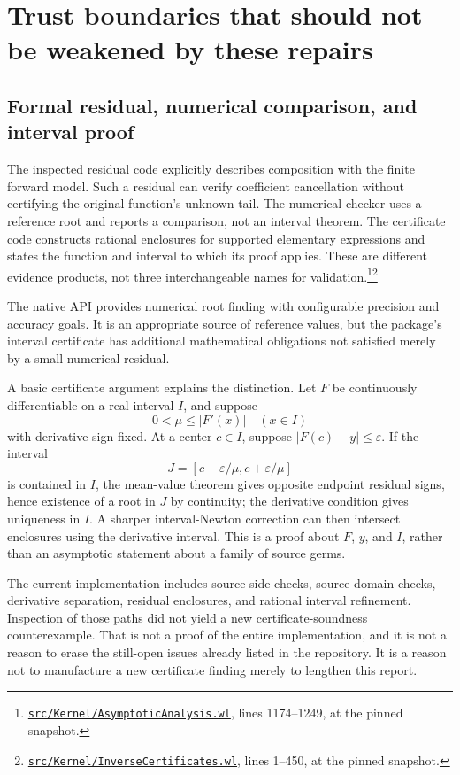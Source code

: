 \documentclass[11pt,letterpaper]{article}
\newcommand{\code}[1]{\texttt{\detokenize{#1}}}
\newcommand{\sr}[3]{\footnote{\href{https://github.com/VladimirReshetnikov/Asymptotic/blob/6687962f3c858a4f93623cfc496f33e35c6763d4/#1\#L#2-L#3}{\nolinkurl{#1}}, lines #2--#3, at the pinned snapshot.}}
\begin{document}
\section{Trust boundaries that should not be weakened by these repairs}

\subsection{Formal residual, numerical comparison, and interval proof}

The inspected residual code explicitly describes composition with the finite forward model. Such a residual can verify coefficient cancellation without certifying the original function's unknown tail. The numerical checker uses a reference root and reports a comparison, not an interval theorem. The certificate code constructs rational enclosures for supported elementary expressions and states the function and interval to which its proof applies. These are different evidence products, not three interchangeable names for validation.\sr{src/Kernel/AsymptoticAnalysis.wl}{1174}{1249}\sr{src/Kernel/InverseCertificates.wl}{1}{450}

The native \code{FindRoot} API provides numerical root finding with configurable precision and accuracy goals. It is an appropriate source of reference values, but the package's interval certificate has additional mathematical obligations not satisfied merely by a small numerical residual.\cite{findroot}

A basic certificate argument explains the distinction. Let $F$ be continuously differentiable on a real interval $I$, and suppose
\[
 0<\mu\leq |F'(x)|\quad(x\in I)
\]
with derivative sign fixed. At a center $c\in I$, suppose $|F(c)-y|\leq\varepsilon$. If the interval
\[
 J=[c-\varepsilon/\mu,c+\varepsilon/\mu]
\]
is contained in $I$, the mean-value theorem gives opposite endpoint residual signs, hence existence of a root in $J$ by continuity; the derivative condition gives uniqueness in $I$. A sharper interval-Newton correction can then intersect enclosures using the derivative interval. This is a proof about $F$, $y$, and $I$, rather than an asymptotic statement about a family of source germs.

The current implementation includes source-side checks, source-domain checks, derivative separation, residual enclosures, and rational interval refinement. Inspection of those paths did not yield a new certificate-soundness counterexample. That is not a proof of the entire implementation, and it is not a reason to erase the still-open issues already listed in the repository. It is a reason not to manufacture a new certificate finding merely to lengthen this report.
\end{document}
